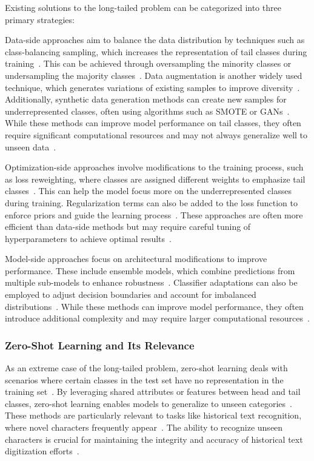 Existing solutions to the long-tailed problem can be categorized into three primary strategies:

Data-side approaches aim to balance the data distribution by techniques such as class-balancing sampling, which increases the representation of tail classes during training~\cite{upsam}. This can be achieved through oversampling the minority classes or undersampling the majority classes~\cite{balance}. Data augmentation is another widely used technique, which generates variations of existing samples to improve diversity~\cite{cutmix}. Additionally, synthetic data generation methods can create new samples for underrepresented classes, often using algorithms such as SMOTE or GANs~\cite{smote, hzsl}. While these methods can improve model performance on tail classes, they often require significant computational resources and may not always generalize well to unseen data~\cite{synthlimit}.

Optimization-side approaches involve modifications to the training process, such as loss reweighting, where classes are assigned different weights to emphasize tail classes~\cite{focal, otem}. This can help the model focus more on the underrepresented classes during training. Regularization terms can also be added to the loss function to enforce priors and guide the learning process~\cite{fudanvi, sanicdar23, logvar}. These approaches are often more efficient than data-side methods but may require careful tuning of hyperparameters to achieve optimal results~\cite{tuning}.

Model-side approaches focus on architectural modifications to improve performance. These include ensemble models, which combine predictions from multiple sub-models to enhance robustness~\cite{fle, flmoe}. Classifier adaptations can also be employed to adjust decision boundaries and account for imbalanced distributions~\cite{normrob}. While these methods can improve model performance, they often introduce additional complexity and may require larger computational resources~\cite{complexity}.

\subsubsection{Zero-Shot Learning and Its Relevance}

As an extreme case of the long-tailed problem, zero-shot learning deals with scenarios where certain classes in the test set have no representation in the training set~\cite{gzsl-survey, olt}. By leveraging shared attributes or features between head and tail classes, zero-shot learning enables models to generalize to unseen categories~\cite{zeroattr}. These methods are particularly relevant to tasks like historical text recognition, where novel characters frequently appear~\cite{novelty}. The ability to recognize unseen characters is crucial for maintaining the integrity and accuracy of historical text digitization efforts~\cite{cultpres}.

